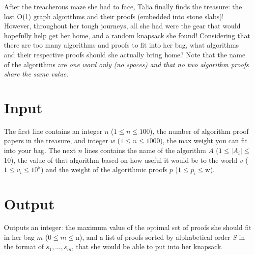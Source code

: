 
After the treacherous maze she had to face, Talia finally finds the treasure: the lost O(1) graph algorithms and their proofs (embedded into stone slabs)! However, throughout her tough journeys,
all she had were the gear that would hopefully help get her home, and a random knapsack she found! Considering that there are too many algorithms and proofs to fit 
into her bag, what algorithms and their respective proofs should she actually bring home? Note that the name of the algorithms are \em {one word only (no spaces)} and that 
no two algorithm proofs share the same value.


\section*{Input}
The first line contains an integer $n$ ($1 \le n \le 100$), the number of algorithm proof papers in the treasure, and integer $w$ ($1 \le n \le 1000$), 
the max weight you can fit into your bag. The next $n$ lines contains the name of the algorithm $A$ ($1 \le |A_i| \le $10), 
the value of that algorithm based on how useful it would be to the world $v$ ($1 \le v_i \le 10^5$)
and the weight of the algorithmic proofs $p$ ($1 \le p_i \le $w).

\section*{Output}
Outputs an integer: the maximum value of the optimal set of proofs she should fit in her bag $m$ ($0 \le m \le $n), 
and a list of proofs sorted by alphabetical order $S$ in the format of $s_1, \dots, s_m$, that she would be able to put into her knapsack.
